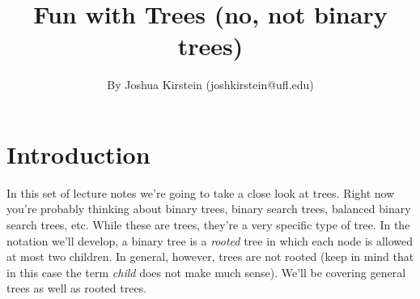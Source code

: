 \documentclass[11pt]{article}
\theoremstyle{plain}
\theoremstyle{definition}
\begin{document}
 


\title{Fun with Trees (no, not binary trees)}
\author{By Joshua Kirstein (joshkirstein@ufl.edu)}
\maketitle

\section{Introduction}
In this set of lecture notes we're going to take a close look at trees. Right now you're probably thinking about binary trees, binary search trees, balanced binary search trees, etc. While these are trees, they're a very specific type of tree. In the notation we'll develop, a binary tree is a \emph{rooted} tree in which each node is allowed at most two children. In general, however, trees are not rooted (keep in mind that in this case the term \emph{child} does not make much sense). We'll be covering general trees as well as rooted trees.
\end{document}
